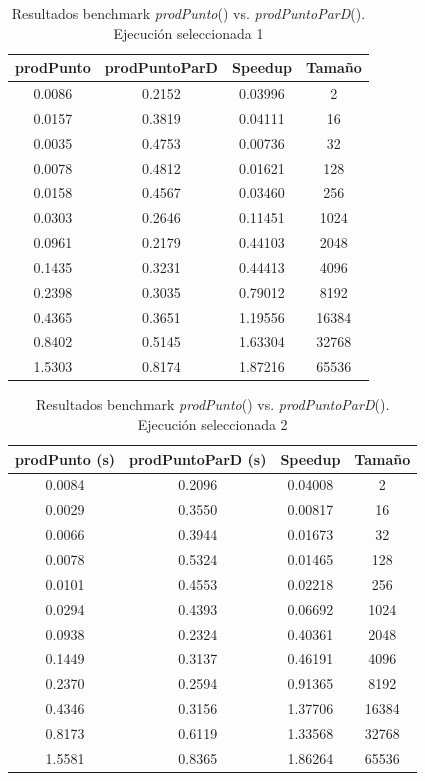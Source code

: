 \documentclass{article}
\begin{document}
\begin{table}[ht]
\centering
\begin{tabular}{|c|c|c|c|}
\hline
\textbf{prodPunto} & \textbf{prodPuntoParD} & \textbf{Speedup} & \textbf{Tamaño} \\
\hline
0.0086 & 0.2152 & 0.03996 & 2 \\
0.0157 & 0.3819 & 0.04111 & 16 \\
0.0035 & 0.4753 & 0.00736 & 32 \\
0.0078 & 0.4812 & 0.01621 & 128 \\
0.0158 & 0.4567 & 0.03460 & 256 \\
0.0303 & 0.2646 & 0.11451 & 1024 \\
0.0961 & 0.2179 & 0.44103 & 2048 \\
0.1435 & 0.3231 & 0.44413 & 4096 \\
0.2398 & 0.3035 & 0.79012 & 8192 \\
0.4365 & 0.3651 & 1.19556 & 16384 \\
0.8402 & 0.5145 & 1.63304 & 32768 \\
1.5303 & 0.8174 & 1.87216 & 65536 \\
\hline
\end{tabular}
\caption{Resultados benchmark \textit{prodPunto}() vs. \textit{prodPuntoParD}(). Ejecución seleccionada 1}
\end{table}

\begin{table}[ht]
\centering
\begin{tabular}{|c|c|c|c|}
\hline
\textbf{prodPunto (s)} & \textbf{prodPuntoParD (s)} & \textbf{Speedup} & \textbf{Tamaño} \\
\hline
0.0084 & 0.2096 & 0.04008 & 2 \\
0.0029 & 0.3550 & 0.00817 & 16 \\
0.0066 & 0.3944 & 0.01673 & 32 \\
0.0078 & 0.5324 & 0.01465 & 128 \\
0.0101 & 0.4553 & 0.02218 & 256 \\
0.0294 & 0.4393 & 0.06692 & 1024 \\
0.0938 & 0.2324 & 0.40361 & 2048 \\
0.1449 & 0.3137 & 0.46191 & 4096 \\
0.2370 & 0.2594 & 0.91365 & 8192 \\
0.4346 & 0.3156 & 1.37706 & 16384 \\
0.8173 & 0.6119 & 1.33568 & 32768 \\
1.5581 & 0.8365 & 1.86264 & 65536 \\
\hline
\end{tabular}
\caption{Resultados benchmark \textit{prodPunto}() vs. \textit{prodPuntoParD}(). Ejecución seleccionada 2}
\end{table}
\end{document}
